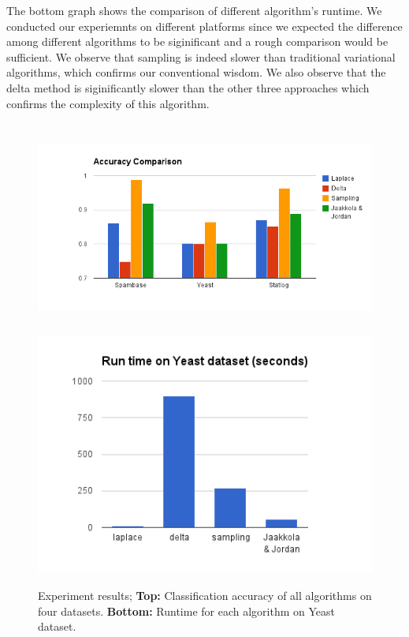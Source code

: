 The bottom graph shows the comparison of different algorithm's runtime. We conducted our experiemnts on different platforms since we expected the difference among different algorithms to be siginificant and a rough comparison would be sufficient. We observe that sampling is indeed slower than traditional variational algorithms, which confirms our conventional wisdom. We also observe that the delta method is siginificantly slower than the other three approaches which confirms the complexity of this algorithm.

\begin{figure}[t]
\centering
\includegraphics[height=7.0cm]{results/accuracy_comp.png}
\includegraphics[height=8.0cm]{results/speed_comp.png}

\caption{\small Experiment results; {\bf Top:} Classification accuracy of all algorithms on
four datasets. {\bf Bottom:} Runtime for each algorithm on Yeast dataset. }
\label{fig:results}
\end{figure}

